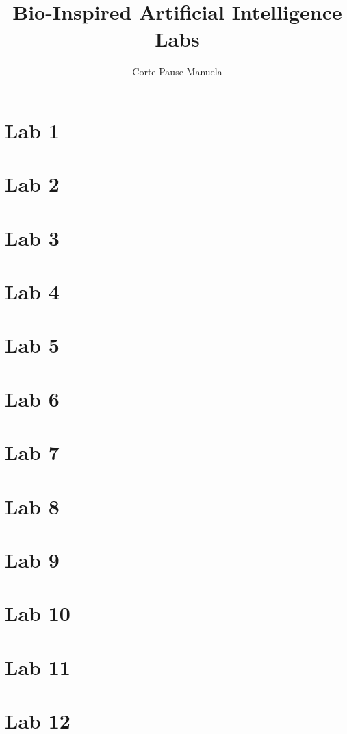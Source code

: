 \documentclass{article}
\title{Bio-Inspired Artificial Intelligence Labs}
\author{Corte Pause Manuela}
\date{}
\begin{document}
\maketitle
\tableofcontents
\newpage

\section{Lab 1}

\newpage

\section{Lab 2}

\newpage

\section{Lab 3}

\newpage

\section{Lab 4}

\newpage

\section{Lab 5}

\newpage

\section{Lab 6}

\newpage

\section{Lab 7}

\newpage

\section{Lab 8}

\newpage

\section{Lab 9}

\newpage

\section{Lab 10}

\newpage

\section{Lab 11}

\newpage

\section{Lab 12}

\newpage
\end{document}
